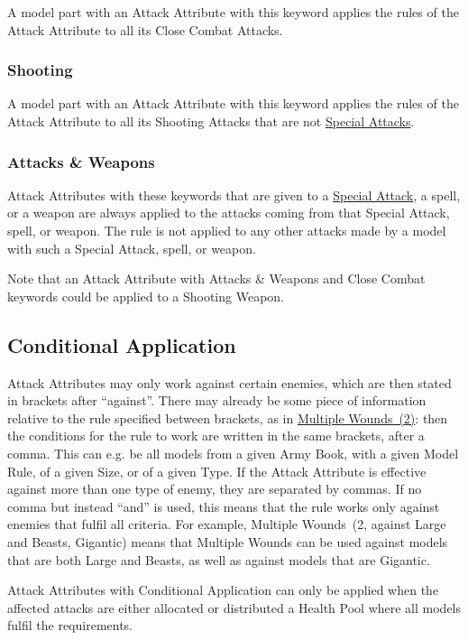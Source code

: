 A model part with an Attack Attribute with this keyword applies the rules of the Attack Attribute to all its Close Combat Attacks.

\subsubsection{Shooting}

A model part with an Attack Attribute with this keyword applies the rules of the Attack Attribute to all its Shooting Attacks that are not \hyperref[special_attacks]{Special Attacks}.

\subsubsection{Attacks \&{} Weapons}

Attack Attributes with these keywords that are given to a \hyperref[special_attacks]{Special Attack}, a spell, or a weapon are always applied to the attacks coming from that Special Attack, spell, or weapon. The rule is not applied to any other attacks made by a model with such a Special Attack, spell, or weapon.

Note that an Attack Attribute with Attacks \&{} Weapons and Close Combat keywords could be applied to a Shooting Weapon.

\subsection{Conditional Application}
\label{conditional_application}

Attack Attributes may only work against certain enemies, which are then stated in brackets after \enquote{against}. There may already be some piece of information relative to the rule specified between brackets, as in \hyperref[multiple_wounds]{Multiple Wounds~(2)}: then the conditions for the rule to work are written in the same brackets, after a comma. This can e.g. be all models from a given Army Book, with a given Model Rule, of a given Size, or of a given Type. If the Attack Attribute is effective against more than one type of enemy, they are separated by commas. If no comma but instead \enquote{and} is used, this means that the rule works only against enemies that fulfil all criteria. For example, Multiple Wounds~(2, against Large and Beasts, Gigantic) means that Multiple Wounds can be used against models that are both Large and Beasts, as well as against models that are Gigantic.

Attack Attributes with Conditional Application can only be applied when the affected attacks are either allocated  or distributed  a Health Pool where all models fulfil the requirements.

